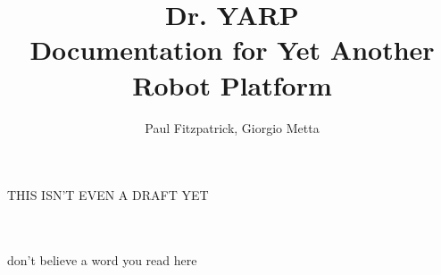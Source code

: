 \documentclass[a4paper]{article}
\begin{document}
\title{Dr. YARP\\ Doc{\small umentation} for Yet Another Robot Platform}


\author{Paul Fitzpatrick, Giorgio Metta}

\maketitle


\begin{center}
{\LARGE 

THIS ISN'T EVEN A DRAFT YET

\ \\

\ \\

don't believe a word you read here
}
\end{center}

\newpage



\newpage


%

%

%

\newpage


\newpage



\end{document}
